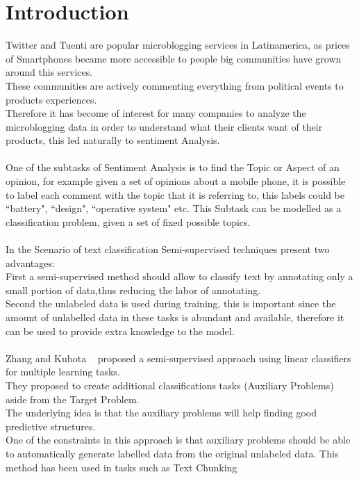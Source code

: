 \documentclass[4pt,a4paper,twocolumn]{article}
\begin{document}
\section{Introduction}
Twitter and Tuenti are popular microblogging services in Latinamerica,
as prices of Smartphones became more accessible to people big communities
have grown around this services.\\
These communities are actively commenting everything from political events to products experiences.\\
Therefore it has become of interest for many companies to analyze the microblogging data in order to understand
what their clients want of their products, this led naturally to sentiment Analysis.\\
\\
One of the subtasks of Sentiment Analysis is to find the Topic or Aspect of an opinion,
for example given a set of opinions about a mobile phone, it is possible to label each comment
with the topic that it is referring to, this labels could be ``battery", ``design", ``operative system" etc.
This Subtask can be modelled as a classification problem, given a set of fixed possible topics.\\
\\
In the Scenario of text classification Semi-supervised techniques present two advantages:\\
First a semi-supervised method should allow to classify text by annotating only a small portion of data,thus reducing the labor of annotating.\\
Second the unlabeled data is used during training, this is important since the amount of unlabelled data in these tasks is abundant and available, therefore it can be used to provide extra knowledge to the model.\\
\\
Zhang and Kubota ~\cite{Ando:2005:FLP:1046920.1194905} proposed a semi-supervised approach using linear classifiers for multiple learning tasks.\\
They proposed to create additional classifications tasks (Auxiliary Problems) aside from the Target Problem.\\
The underlying idea is that the auxiliary problems will help finding good predictive structures.\\
One of the constraints in this approach is that auxiliary problems should be  able to automatically generate labelled data from the original unlabeled data.
This method has been used in tasks such as Text Chunking ~\cite{Ando:2005:HSL:1219840.1219841}\\
\end{document}
